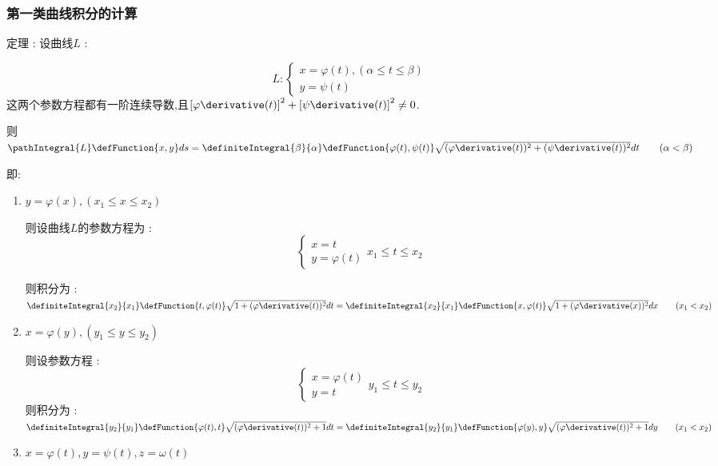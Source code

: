 {{  \subsubsection{第一类曲线积分的计算}{
    定理 : 设曲线$L$ :
    \begin{center}
      $$
        L :
        \begin{cases}
          x = \varphi(t),(\alpha \leq t \leq \beta) \\
          y = \psi(t)
        \end{cases}
      $$
      这两个参数方程都有一阶连续导数,且$\left[\varphi\derivative(t)\right]^2 + \left[\psi\derivative(t)\right]^2 \neq 0$.
    \end{center}

    则$\pathIntegral{L}\defFunction{x,y}ds = \definiteIntegral{\beta}{\alpha}\defFunction{\varphi(t),\psi(t)}\sqrt{(\varphi\derivative(t))^2 + (\psi\derivative(t))^2}dt\qquad (\alpha < \beta)$

    即:
    \begin{enumerate}
      \item {
            $y = \varphi(x),(x_1 \leq x \leq x_2)$

            则设曲线$L$的参数方程为 :
            $$
              \begin{cases}
                x = t \\
                y = \varphi(t)
              \end{cases}
              x_1 \leq t \leq x_2
            $$

            则积分为 : $\definiteIntegral{x_2}{x_1}\defFunction{t,\varphi(t)}\sqrt{1 + (\varphi\derivative(t))^2}dt = \definiteIntegral{x_2}{x_1}\defFunction{x,\varphi(t)}\sqrt{1 + (\varphi\derivative(x))^2}dx\qquad (x_1 < x_2)$
            }
      \item {
            $x = \varphi(y),(y_1 \leq y \leq y_2)$

            则设参数方程 :
            $$
              \begin{cases}
                x = \varphi(t) \\
                y = t
              \end{cases}
              y_1 \leq t \leq y_2
            $$
            则积分为 : $\definiteIntegral{y_2}{y_1}\defFunction{\varphi(t),t}\sqrt{(\varphi\derivative(t))^2 + 1}dt = \definiteIntegral{y_2}{y_1}\defFunction{\varphi(y),y}\sqrt{(\varphi\derivative(t))^2 + 1}dy\qquad (x_1 < x_2)$
            }
      \item{
            $x = \varphi(t),y = \psi(t),z = \omega(t)$

}
\end{enumerate}}}}
